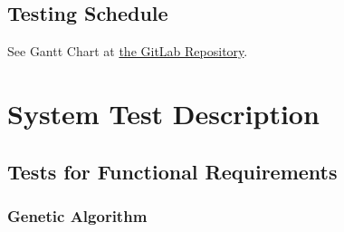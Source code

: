 \documentclass[12pt, titlepage]{article}
\begin{document}
\subsection{Testing Schedule}
		
See Gantt Chart at
\href{https://gitlab.cas.mcmaster.ca/linkk4/GrateBox/tree/master/ProjectSchedule}{the 
GitLab Repository}.

\section{System Test Description}
	
\subsection{Tests for Functional Requirements}

\subsubsection{Genetic Algorithm}
\end{document}
